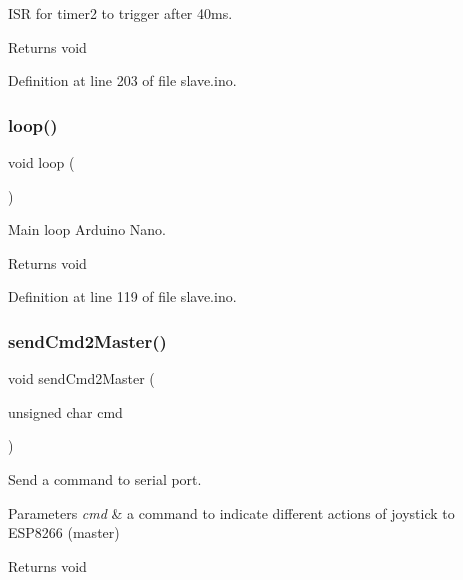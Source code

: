 I\+SR for timer2 to trigger after 40ms. 

\begin{DoxyReturn}{Returns}
void 
\end{DoxyReturn}


Definition at line 203 of file slave.\+ino.

\mbox{\label{slave_8ino_afe461d27b9c48d5921c00d521181f12f}} 
\subsubsection{\texorpdfstring{loop()}{loop()}}
{\footnotesize\ttfamily void loop (\begin{DoxyParamCaption}{ }\end{DoxyParamCaption})}



Main loop Arduino Nano. 

\begin{DoxyReturn}{Returns}
void 
\end{DoxyReturn}


Definition at line 119 of file slave.\+ino.

\mbox{\label{slave_8ino_afaecaf2f7ff3d385786f146797fe3970}} 
\subsubsection{\texorpdfstring{sendCmd2Master()}{sendCmd2Master()}}
{\footnotesize\ttfamily void send\+Cmd2\+Master (\begin{DoxyParamCaption}\item[{unsigned char}]{cmd }\end{DoxyParamCaption})}



Send a command to serial port. 


\begin{DoxyParams}{Parameters}
{\em cmd} & a command to indicate different actions of joystick to E\+S\+P8266 (master) \\
\hline
\end{DoxyParams}
\begin{DoxyReturn}{Returns}
void 
\end{DoxyReturn}


